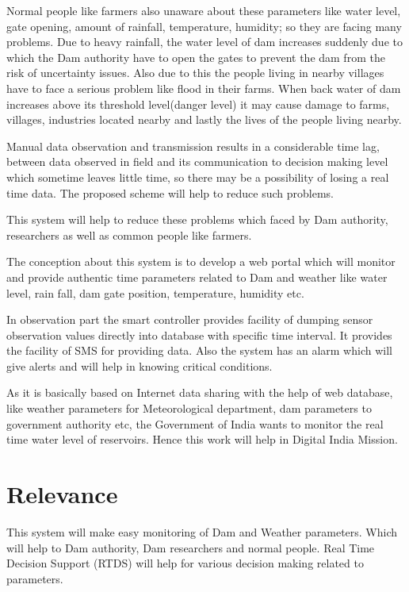 \documentclass[a4paper,12pt]{report}
\begin{document}
Normal people like farmers also unaware about these parameters 
like water level, gate opening, amount of rainfall, temperature, humidity; so they are facing many problems.
Due to heavy rainfall, the water level of dam increases suddenly due to which the Dam authority have to open the gates to prevent the dam from the risk of uncertainty issues. Also due to this the people living in nearby villages have to face a serious problem like flood in their farms. 
When back water of dam increases above its threshold level(danger level) it may cause damage to farms, villages, industries located nearby and lastly the lives of the people living nearby.
\newline

Manual data observation and transmission results in a considerable time
lag, between data observed in field and its communication to decision making level
which sometime leaves little time, so there may be a possibility of losing a real time data.
The proposed scheme will help to reduce such problems.
\newline

This system will help to reduce these problems which faced by Dam authority, researchers as well as common people like farmers. 
\newline

The conception about this system is to develop a web portal which will monitor and provide authentic time parameters related to Dam and weather like water level, rain fall, dam gate position, temperature, humidity etc. 
\newline

In observation part the smart controller provides facility of dumping sensor observation values directly into database with specific time interval. It provides the facility of SMS for providing data. Also the system has an alarm which will give alerts and will help in knowing critical conditions.
\newline

As it is basically based on Internet data sharing with the help of web database, like weather parameters for Meteorological department, dam parameters to government authority etc, the Government of India wants to monitor the real time water level of reservoirs. Hence this work will help in Digital India Mission.

\section{Relevance}
This system will make easy monitoring of Dam and Weather parameters. 
Which will help to Dam authority, Dam researchers and normal people. 
Real Time Decision Support (RTDS) will help for various decision making related to parameters.
\end{document}
